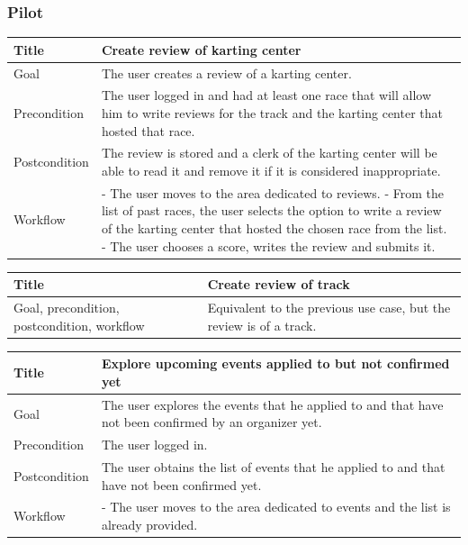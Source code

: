 \documentclass{beamer}
\begin{document}
\begin{frame}
    \frametitle{Pilot}
    \begin{table}
        \tiny
        \begin{tabular}{|p{2cm}|p{6cm}|}
        \hline
        Title & \textbf{Create review of karting center} \\
        \hline
        Goal & The user creates a review of a karting center. \\
        \hline
        Precondition & The user logged in and had at least one race that will allow him to write 
        reviews for the track and the karting center that hosted that race. \\
        \hline
        Postcondition & The review is stored and a clerk of the karting center will be able to 
        read it and remove it if it is considered inappropriate. \\
        \hline
        Workflow &
        - The user moves to the area dedicated to reviews. \newline
        - From the list of past races, the user selects the option to write a review of the karting center that
        hosted the chosen race from the list. \newline
        - The user chooses a score, writes the review and submits it. \\
        \hline
        \end{tabular}
    \end{table}

    \begin{table}
        \tiny
        \begin{tabular}{|p{2cm}|p{6cm}|}
        \hline
        Title & \textbf{Create review of track} \\
        \hline
        Goal, precondition, postcondition, workflow & Equivalent to the previous use case, but the review is of a track. \\
        \hline
        \end{tabular}
    \end{table}

    \begin{table}
        \tiny
        \begin{tabular}{|p{2cm}|p{6cm}|}
        \hline
        Title & \textbf{Explore upcoming events applied to but not confirmed yet} \\
        \hline
        Goal & The user explores the events that he applied to 
        and that have not been confirmed by an organizer yet. \\
        \hline
        Precondition & The user logged in. \\
        \hline
        Postcondition & The user obtains the list of events that he 
        applied to and that have not been confirmed yet. \\
        \hline
        Workflow &
        - The user moves to the area dedicated to events and the list is already provided. \\
        \hline
        \end{tabular}
    \end{table}
\end{frame}
\end{document}
